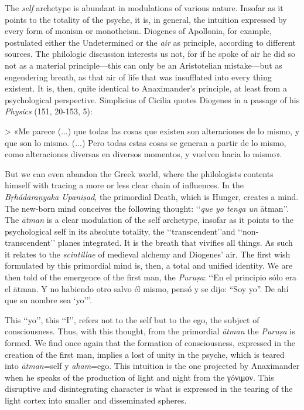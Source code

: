 \documentclass[a4paper]{article}
\begin{document}
The \textit{self} archetype is abundant in modulations of various nature.
Insofar as it points to the totality of the psyche, it is, in general, the
intuition expressed by every form of monism or monotheism. Diogenes of
Apollonia, for example, postulated either the Undetermined or the \textit{air}
as principle, according to different sources. The philologic discussion
interests us not, for if he spoke of air he did so not as a material
principle---this can only be an Aristotelian mistake---but as engendering
breath, as that air of life that was insufflated into every thing existent. It
is, then, quite identical to Anaximander's principle, at least from a
psychological perspective. Simplicius of Cicilia quotes Diogenes in a passage of
his \textit{Physics} (151, 20-153, 5):

> «Me parece (...) que todas las cosas que existen son alteraciones de lo mismo,
y que son lo mismo. (...) Pero todas estas cosas se generan a partir de lo
mismo, como alteraciones diversas en diversos momentos, y vuelven hacia lo
mismo».

But we can even abandon the Greek world, where the philologists contents himself
with tracing a more or less clear chain of influences. In the
\textit{Bṛhádāraṇyaka Upaniṣad}, the primordial Death, which is Hunger, creates
a mind. The new-born mind conceives the following thought: \lq\lq \textit{que yo
tenga un }ātman\rq\rq{}. The \textit{ātman} is a clear modulation of the self
archetype, insofar as it points to the psychological self in its absolute
totality, the \lq\lq transcendent\rq\rq and \lq\lq non-transcendent\rq\rq{}
planes integrated. It is the breath that vivifies all things. As such it relates
to the \textit{scintillae} of medieval alchemy and Diogenes' air. The first wish
formulated by this primordial mind is, then, a total and unified identity. We
are then told of the emergence of the first man, the \textit{Puruṣa}: \lq\lq En
el principio sólo era el ātman. Y no habiendo otro salvo él mismo, pensó y se
dijo: “Soy yo”. De ahí que su nombre sea \lq yo\rq{}\rq\rq{}.

This \lq\lq yo\rq\rq{}, this \lq\lq I\rq\rq{}, refers not to the self but to the
ego, the subject of consciousness. Thus, with this thought, from the primordial
\textit{ātman} the \textit{Puruṣa} is formed. We find once again that the
formation of consciousness, expressed in the creation of the first man, implies
a lost of unity in the psyche, which is teared into \textit{ātman}=self y
\textit{aham}=ego. This intuition is the one projected by Anaximander when he
speaks of the production of light and night from the γóνιμον. This disruptive
and disintegrating character is what is expressed in the tearing of the light
cortex into smaller and disseminated spheres. 
\end{document}
